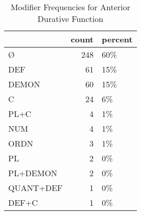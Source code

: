 \begin{table}[htbp!]
\centering
\caption{Modifier Frequencies for Anterior Durative Function}
\label{table:antdur_mod_cp}
\begin{tabular}{lrl}
\toprule
{} &  count & percent \\
\midrule
Ø         &    248 &     60\% \\
DEF       &     61 &     15\% \\
DEMON     &     60 &     15\% \\
C         &     24 &      6\% \\
PL+C      &      4 &      1\% \\
NUM       &      4 &      1\% \\
ORDN      &      3 &      1\% \\
PL        &      2 &      0\% \\
PL+DEMON  &      2 &      0\% \\
QUANT+DEF &      1 &      0\% \\
DEF+C     &      1 &      0\% \\
\bottomrule
\end{tabular}
\end{table}
